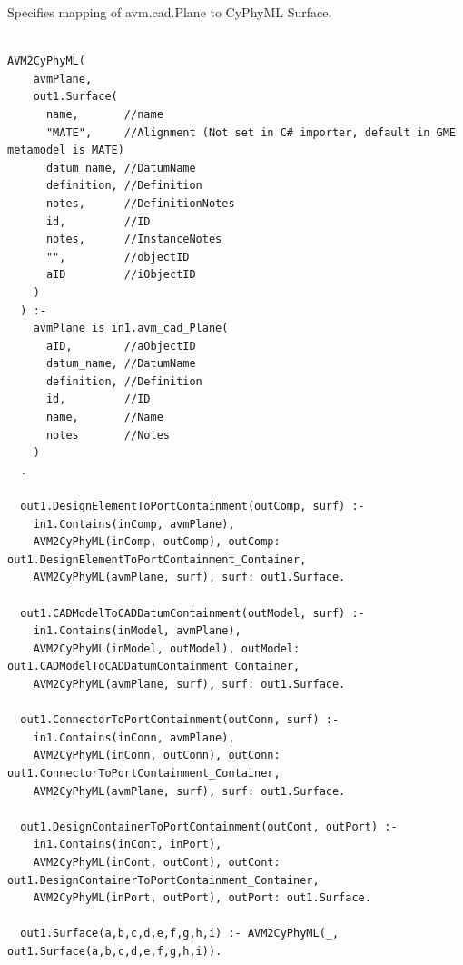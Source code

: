 Specifies mapping of avm.cad.Plane to CyPhyML Surface.
\begin{lstlisting}

AVM2CyPhyML(
    avmPlane,
    out1.Surface(
      name,       //name
      "MATE",     //Alignment (Not set in C# importer, default in GME metamodel is MATE)
      datum_name, //DatumName
      definition, //Definition
      notes,      //DefinitionNotes
      id,         //ID
      notes,      //InstanceNotes
      "",         //objectID
      aID         //iObjectID
    )
  ) :-
    avmPlane is in1.avm_cad_Plane(
      aID,        //aObjectID
      datum_name, //DatumName
      definition, //Definition
      id,         //ID
      name,       //Name
      notes       //Notes
    )
  .

  out1.DesignElementToPortContainment(outComp, surf) :-
    in1.Contains(inComp, avmPlane),
    AVM2CyPhyML(inComp, outComp), outComp: out1.DesignElementToPortContainment_Container,
    AVM2CyPhyML(avmPlane, surf), surf: out1.Surface.

  out1.CADModelToCADDatumContainment(outModel, surf) :-
    in1.Contains(inModel, avmPlane),
    AVM2CyPhyML(inModel, outModel), outModel: out1.CADModelToCADDatumContainment_Container,
    AVM2CyPhyML(avmPlane, surf), surf: out1.Surface.

  out1.ConnectorToPortContainment(outConn, surf) :-
    in1.Contains(inConn, avmPlane),
    AVM2CyPhyML(inConn, outConn), outConn: out1.ConnectorToPortContainment_Container,
    AVM2CyPhyML(avmPlane, surf), surf: out1.Surface.

  out1.DesignContainerToPortContainment(outCont, outPort) :-
    in1.Contains(inCont, inPort),
    AVM2CyPhyML(inCont, outCont), outCont: out1.DesignContainerToPortContainment_Container,
    AVM2CyPhyML(inPort, outPort), outPort: out1.Surface.

  out1.Surface(a,b,c,d,e,f,g,h,i) :- AVM2CyPhyML(_, out1.Surface(a,b,c,d,e,f,g,h,i)).


\end{lstlisting}

